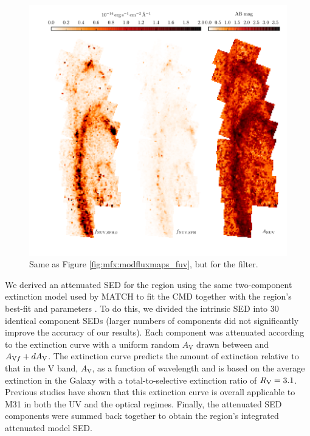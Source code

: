 \documentclass[iop, tighten]{emulateapj}
\begin{document}
\begin{figure}
\centering
\includegraphics[width=\textwidth]{m31flux-figures/modfluxmaps_nuv.pdf}
\caption[\nuv{} flux map modeled from the SFHs.]{Same as Figure
    \ref{fig:mfx:modfluxmaps_fuv}, but for the \nuv{} filter.
}
\label{fig:mfx:modfluxmaps_nuv}
\end{figure}


We derived an attenuated SED for the region using the same two-component
extinction model used by MATCH to fit the CMD together with the region's
best-fit \avf{} and \dav{} parameters \citep{Lewis:2014}. To do this, we
divided the intrinsic SED into 30 identical component SEDs (larger numbers of
components did not significantly improve the accuracy of our results). Each
component was attenuated according to the \citet{Cardelli:1989} extinction
curve with a uniform random $A_\mathrm{V}$ drawn between \avf{} and $A_{\mathrm{V}f} +
dA_\mathrm{V}$. The \citet{Cardelli:1989} extinction curve predicts the amount of
extinction relative to that in the V band, $A_\mathrm{V}$, as a function of
wavelength and is based on the average extinction in the Galaxy with a
total-to-selective extinction ratio of $R_\mathrm{V} = 3.1$. Previous studies have shown
that this extinction curve is overall applicable to M31 in both the UV
\citep{Bianchi:1996} and the optical \citep{Barmby:2000} regimes. Finally, the
attenuated SED components were summed back together to obtain the region's
integrated attenuated model SED.
\end{document}
